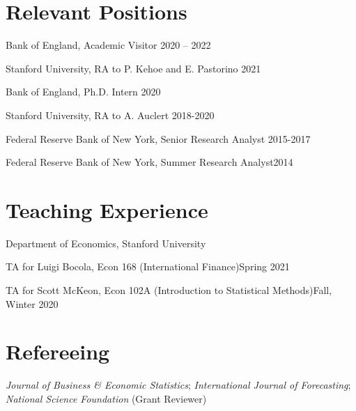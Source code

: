 \documentclass[margin,line]{res}                          %
\newenvironment{list1}{
	\begin{list}{\ding{113}}{%
			\setlength{\itemsep}{0in}
			\setlength{\parsep}{0in} \setlength{\parskip}{0in}
			\setlength{\topsep}{0in} \setlength{\partopsep}{0in}
			\setlength{\leftmargin}{0.17in}}}{\end{list}}
\begin{document}
\begin{resume}
	
	\section{\sc Relevant Positions}
	\begin{list1}
		\item[] Bank of England, Academic Visitor  \hfill 2020 -- 2022
		\smallskip
		\item[] Stanford University, RA to P. Kehoe and E. Pastorino  \hfill 2021
		\smallskip
		\item[] Bank of England, Ph.D. Intern \hfill 2020
		\smallskip
		\item[] {Stanford University}, RA to A. Auclert  \hfill 2018-2020 \smallskip
		\item[] {Federal Reserve Bank of New York}, Senior Research Analyst  \hfill 2015-2017 \smallskip
		\item[] {Federal Reserve Bank of New York}, Summer Research Analyst\hfill 2014
	\end{list1}
	
	
	\section{\sc Teaching Experience}
	\begin{list1}
		\item[] {Department of Economics, Stanford University} \smallskip
		\item[] TA for Luigi Bocola, Econ 168 (International Finance)\hfill Spring 2021\smallskip
		\item[] TA for Scott McKeon, Econ 102A (Introduction to Statistical Methods)\hfill Fall, Winter 2020\smallskip
	\end{list1}
	
	\section{\sc Refereeing}
	\begin{list1}
		\item[] \emph{Journal of Business \& Economic Statistics}; \emph{International Journal of Forecasting}; \emph{National Science Foundation} (Grant Reviewer) \smallskip
	\end{list1}
	

\end{resume}
\end{document}
